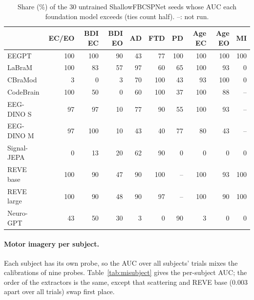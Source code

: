 \documentclass[11pt]{article}
\begin{document}
\begin{table}[h]
\centering\footnotesize\setlength{\tabcolsep}{3.5pt}
\caption{Share (\%) of the 30 untrained ShallowFBCSPNet seeds whose AUC each foundation model
exceeds (ties count half). --: not run.}
\label{tab:fmseeds}
\begin{tabular}{@{}lrrrrrrrrr@{}}
\toprule
& EC/EO & BDI EC & BDI EO & AD & FTD & PD & Age EC & Age EO & MI \\
\midrule
EEGPT & 100 & 100 & 90 & 43 & 77 & 100 & 100 & 100 & 100 \\
LaBraM & 100 & 83 & 57 & 97 & 60 & 65 & 100 & 93 & 0 \\
CBraMod & 3 & 0 & 3 & 70 & 100 & 43 & 93 & 100 & 0 \\
CodeBrain & 100 & 50 & 0 & 60 & 100 & 37 & 100 & 88 & -- \\
EEG-DINO S & 97 & 97 & 10 & 77 & 90 & 55 & 100 & 93 & -- \\
EEG-DINO M & 97 & 100 & 10 & 43 & 40 & 77 & 80 & 43 & -- \\
Signal-JEPA & 0 & 13 & 20 & 62 & 90 & 0 & 0 & 0 & 0 \\
REVE base & 100 & 90 & 47 & 90 & 100 & -- & 100 & 93 & 100 \\
REVE large & 100 & 90 & 48 & 90 & 97 & -- & 100 & 90 & 100 \\
Neuro-GPT & 43 & 50 & 30 & 3 & 0 & 90 & 3 & 0 & 0 \\
\bottomrule
\end{tabular}
\end{table}

\paragraph{Motor imagery per subject.} Each subject has its own probe, so the AUC over all
subjects' trials mixes the calibrations of nine probes. Table~\ref{tab:misubject} gives the
per-subject AUC; the order of the extractors is the same, except that scattering and REVE base
(0.003 apart over all trials) swap first place.
\end{document}
